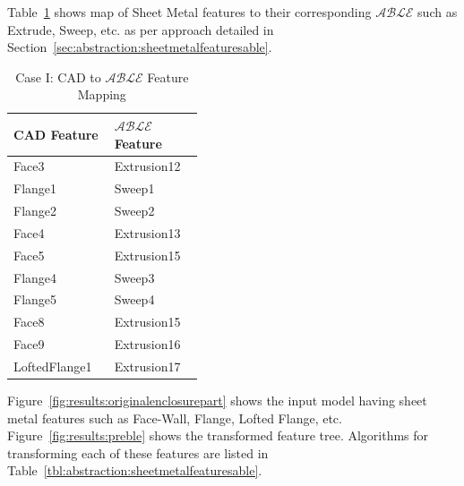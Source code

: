 Table~\ref{tbl:results:cadablemap} shows map of Sheet Metal features to their corresponding $\mathcal{ABLE}$ such as Extrude, Sweep, etc. as per approach detailed in Section~\ref{sec:abstraction:sheetmetalfeaturesable}.

\begin{table}[!h]
\centering
\caption{Case I: CAD to $\mathcal{ABLE}$ Feature Mapping}
\label{tbl:results:cadablemap}
\begin{tabular}[h]{@{} p{0.21\linewidth} p{0.21\linewidth} @{}}
\toprule
{\bf CAD Feature } & {$\mathcal{ABLE}$ Feature}\\ \midrule
Face3 & Extrusion12\\
Flange1 & Sweep1\\
Flange2 & Sweep2 \\
Face4 & Extrusion13\\
Face5 & Extrusion15\\
Flange4 & Sweep3\\
Flange5 & Sweep4\\
Face8 & Extrusion15\\
Face9 & Extrusion16\\
LoftedFlange1 & Extrusion17\\
\bottomrule
\end{tabular}

\end{table}



 Figure~\ref{fig:results:originalenclosurepart} shows the input model having sheet metal features such as Face-Wall, Flange, Lofted Flange, etc. Figure~\ref{fig:results:preble} shows the transformed feature tree. Algorithms for transforming each of these features are listed in Table~\ref{tbl:abstraction:sheetmetalfeaturesable}.


